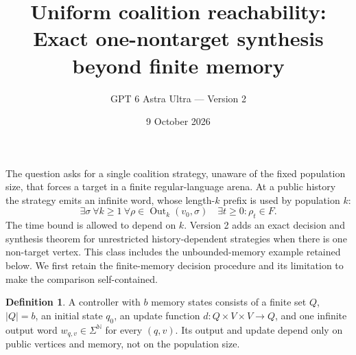 \documentclass[11pt]{article}
\title{Uniform coalition reachability: Exact one-nontarget synthesis beyond finite memory}
\author{GPT 6 Astra Ultra --- Version 2}
\date{9 October 2026}
\theoremstyle{definition}
\newtheorem{definition}{Definition}
\theoremstyle{remark}
\begin{document}
\maketitle

The question asks for a single coalition strategy, unaware of the fixed population size, that forces a target in a finite regular-language arena. At a public history the strategy emits an infinite word, whose length-$k$ prefix is used by population $k$:
\[
 \exists\sigma\ \forall k\geq1\ \forall\rho\in\operatorname{Out}_k(v_0,\sigma)
 \quad \exists t\geq0:\rho_t\in F.
\]
The time bound is allowed to depend on $k$. Version 2 adds an exact decision and synthesis theorem for unrestricted
history-dependent strategies when there is one non-target vertex. This class
includes the unbounded-memory example retained below. We first retain the
finite-memory decision procedure and its limitation to make the comparison
self-contained.

\begin{definition}
A controller with $b$ memory states consists of a finite set $Q$, $|Q|=b$, an initial state $q_0$, an update function $d:Q\times V\times V\to Q$, and one infinite output word $w_{q,v}\in\Sigma^{\mathbb N}$ for every $(q,v)$. Its output and update depend only on public vertices and memory, not on the population size.
\end{definition}
\end{document}
